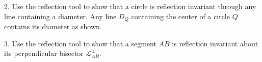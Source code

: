 \documentclass{tufte-handout}
\newcommand{\uvx}{\vspace{.2in}}
\begin{document}
\begin{tcolorbox}
 \uvx 2. Use the reflection tool to show that a circle is reflection invariant through any line containing a diameter. Any line $D_Q$ containing the center of a circle $Q$ contains its diameter as shown.
  \begin{center}
 \end{center}
 
 \uvx 3. Use the reflection tool to show that a segment $\overline{AB}$ is reflection invariant about its perpendicular bisector $\mathcal{L}_{AB}^{\perp}$. 
 \begin{center}
 \end{center}



\end{tcolorbox}
\end{document}
